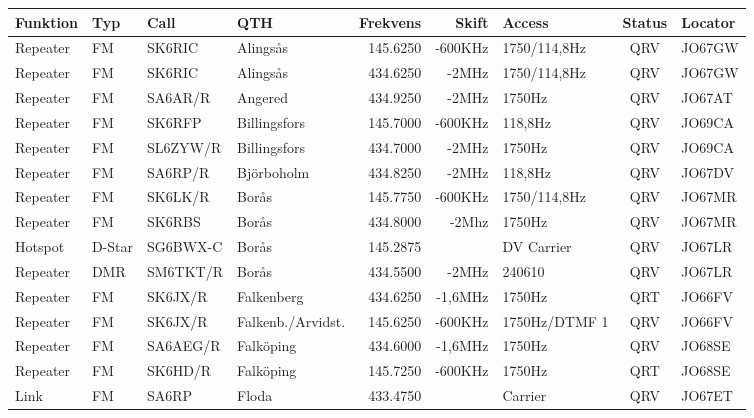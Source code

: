 \begin{longtable}{llllrrlcl}

\textbf{Funktion} & \textbf{Typ}    & \textbf{Call} & \textbf{QTH} & \textbf{Frekvens} & \textbf{Skift} & 
\textbf{Access}   & \textbf{Status} & \textbf{Locator} \\ \hline \endhead

Repeater & FM     & SK6RIC   & Alingsås            & 145.6250  & -600KHz & 1750/114,8Hz    & QRV  & JO67GW \\
Repeater & FM     & SK6RIC   & Alingsås            & 434.6250  & -2MHz   & 1750/114,8Hz    & QRV  & JO67GW \\
Repeater & FM     & SA6AR/R  & Angered             & 434.9250  & -2MHz   & 1750Hz          & QRV  & JO67AT \\
Repeater & FM     & SK6RFP   & Billingsfors        & 145.7000  & -600KHz & 118,8Hz         & QRV  & JO69CA \\
Repeater & FM     & SL6ZYW/R & Billingsfors        & 434.7000  & -2MHz   & 1750Hz          & QRV  & JO69CA \\
Repeater & FM     & SA6RP/R  & Björboholm          & 434.8250  & -2MHz   & 118,8Hz         & QRV  & JO67DV \\
Repeater & FM     & SK6LK/R  & Borås               & 145.7750  & -600KHz & 1750/114,8Hz    & QRV  & JO67MR \\
Repeater & FM     & SK6RBS   & Borås               & 434.8000  & -2Mhz   & 1750Hz          & QRV  & JO67MR \\
Hotspot  & D-Star & SG6BWX-C & Borås               & 145.2875  &         & DV Carrier      & QRV  & JO67LR \\
Repeater & DMR    & SM6TKT/R & Borås               & 434.5500  & -2MHz   & 240610          & QRV  & JO67LR \\
Repeater & FM     & SK6JX/R  & Falkenberg          & 434.6250  & -1,6MHz & 1750Hz          & QRT  & JO66FV \\
Repeater & FM     & SK6JX/R  & Falkenb./Arvidst.   & 145.6250  & -600KHz & 1750Hz/DTMF 1   & QRV  & JO66FV \\
Repeater & FM     & SA6AEG/R & Falköping           & 434.6000  & -1,6MHz & 1750Hz          & QRV  & JO68SE \\
Repeater & FM     & SK6HD/R  & Falköping           & 145.7250  & -600KHz & 1750Hz          & QRT  & JO68SE \\
Link     & FM     & SA6RP    & Floda               & 433.4750  &         & Carrier         & QRV  & JO67ET \\

\end{longtable}
